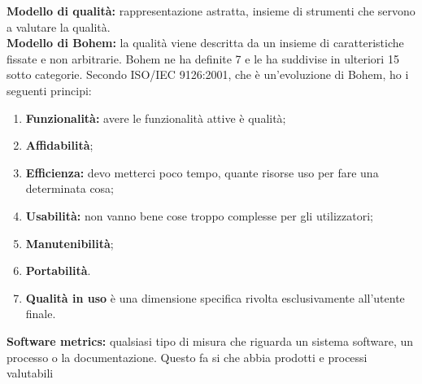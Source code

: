 \textbf{Modello di qualità:} rappresentazione astratta, insieme di strumenti che servono a valutare la qualità.\\ 
\textbf{Modello di Bohem:} la qualità viene descritta da un insieme di caratteristiche fissate e non arbitrarie. Bohem ne ha definite 7 e le ha suddivise in ulteriori 15 sotto categorie. Secondo ISO/IEC 9126:2001, che è un'evoluzione di Bohem, ho i seguenti principi:

\begin{enumerate}

	\item \textbf{Funzionalità:} avere le funzionalità attive è qualità;
	\item \textbf{Affidabilità};
	\item \textbf{Efficienza:} devo metterci poco tempo, quante risorse uso per fare una determinata cosa;
	\item \textbf{Usabilità:} non vanno bene cose troppo complesse per gli utilizzatori;
	\item \textbf{Manutenibilità};
	\item \textbf{Portabilità}.
	\item \textbf{Qualità in uso} è una dimensione specifica rivolta esclusivamente all'utente finale.
\end{enumerate}

\textbf{Software metrics:} qualsiasi tipo di misura che riguarda un sistema software, un processo o la documentazione. Questo fa si che abbia prodotti e processi valutabili


